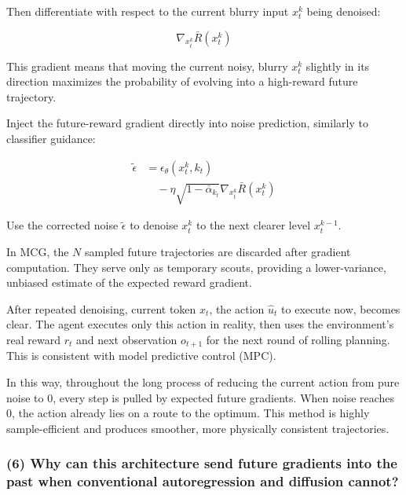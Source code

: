 Then differentiate with respect to the current blurry input \(x_t^k\) being denoised:

\[
\nabla_{x_t^k}\bar{R}(x_t^k)
\]

This gradient means that moving the current noisy, blurry \(x_t^k\) slightly in its direction maximizes the probability of evolving into a high-reward future trajectory.

Inject the future-reward gradient directly into noise prediction, similarly to classifier guidance:

\[
\begin{aligned}
\tilde{\epsilon}
&=
\epsilon_\theta(x_t^k,k_t)
\\
&\quad -
\eta\sqrt{1-\bar{\alpha}_{k_t}}\nabla_{x_t^k}\bar{R}(x_t^k)
\end{aligned}
\]

Use the corrected noise \(\tilde{\epsilon}\) to denoise \(x_t^k\) to the next clearer level \(x_t^{k-1}\).

In MCG, the \(N\) sampled future trajectories are discarded after gradient computation. They serve only as temporary scouts, providing a lower-variance, unbiased estimate of the expected reward gradient.

After repeated denoising, current token \(x_t\), the action \(\hat{u}_t\) to execute now, becomes clear. The agent executes only this action in reality, then uses the environment's real reward \(r_t\) and next observation \(o_{t+1}\) for the next round of rolling planning. This is consistent with model predictive control (MPC).

In this way, throughout the long process of reducing the current action from pure noise to 0, every step is pulled by expected future gradients. When noise reaches 0, the action already lies on a route to the optimum. This method is highly sample-efficient and produces smoother, more physically consistent trajectories.

\hypertarget{why-can-this-architecture-send-future-gradients-into-the-past-when-conventional-autoregression-and-diffusion-cannot}{%
\subsubsection{(6) Why can this architecture send future gradients into the past when conventional autoregression and diffusion cannot?}\label{why-can-this-architecture-send-future-gradients-into-the-past-when-conventional-autoregression-and-diffusion-cannot}}

